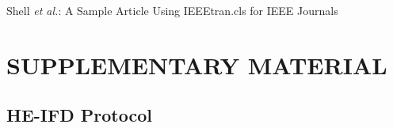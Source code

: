 \documentclass[journal]{IEEEtran}
\begin{document}


%
{Shell \MakeLowercase{\textit{et al.}}: A Sample Article Using IEEEtran.cls for IEEE Journals}



\section*{SUPPLEMENTARY MATERIAL}

\subsection{HE-IFD Protocol}
\end{document}
